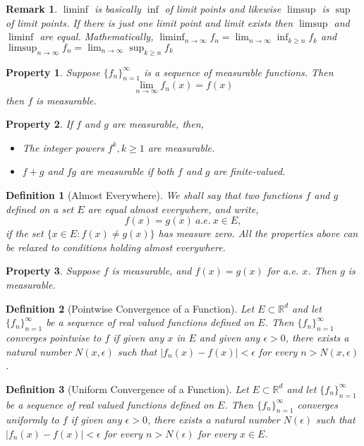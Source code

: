 \documentclass{report}
\theoremstyle{upthm}
\newtheorem{defn}{Definition}
\newtheorem{remark}{Remark}
\newtheorem{property}{Property}
\newcommand{\reals}{\mathbb{R}}
\newcommand{\set}[1]{\big\lbrace #1 \big\rbrace}
\begin{document}
\begin{remark}
	$\liminf$ is basically $\inf$ of limit points and likewise $\limsup$ is $\sup$ of limit points. If there is just one limit point and limit exists then $\limsup$ and $\liminf$ are equal. Mathematically, $\liminf_{n \rightarrow \infty} f_n= \lim_{n \rightarrow \infty} \inf_{k \geq n} f_k$ and  $\limsup_{n \rightarrow \infty} f_n= \lim_{n \rightarrow \infty} \sup_{k \geq n} f_k$
\end{remark}

\begin{property}
	Suppose $\set{f_n}_{n=1}^\infty$ is a sequence of measurable functions. Then $$\lim_{n \rightarrow \infty} f_n(x) = f(x) $$ then $f$ is measurable.
\end{property}
\begin{property}
	If $f$ and $g$ are measurable, then,
	\begin{itemize}
		\item The integer powers $f^k, k \geq 1$ are measurable.
		\item $f + g$ and $fg$ are measurable if both $f$ and $g$ are finite-valued.
	\end{itemize}
\end{property}

\begin{defn}[Almost Everywhere]
	We shall say that two functions $f$ and $g$ defined on a set $E$ are equal almost everywhere, and write,
	$$ f(x) = g(x)\ a.e.\ x \in E,$$
	if the set $\set{x \in E : f(x) \neq g(x)}$ has measure zero. All the properties above can be relaxed to conditions holding almost everywhere.
\end{defn}

\begin{property}
	Suppose $f$ is measurable, and $f(x) = g(x)$ for a.e. $x$. Then $g$ is measurable.
\end{property}

\begin{defn}[Pointwise Convergence of a Function]
	Let $E \subset \reals^d$ and let $\set{f_n}_{n=1}^{\infty}$ be a sequence of real valued functions defined on $E$. Then $\set{f_n}_{n=1}^\infty$ converges pointwise to $f$ if given any $x$ in $E$ and	given any $\epsilon > 0$, there exists a natural number $N(x, \epsilon)$ such that $|f_n(x) - f(x)| < \epsilon$ for every $n > N(x, \epsilon)$.
\end{defn}

\begin{defn}[Uniform Convergence of a Function]
	Let $E \subset \reals^d$ and let $\set{f_n}_{n=1}^{\infty}$ be a sequence of real valued functions defined on $E$. Then $\set{f_n}_{n=1}^\infty$ converges uniformly to $f$ if given any $\epsilon > 0$, there exists a natural number $N(\epsilon)$ such that $|f_n(x) - f(x)| < \epsilon$ for every $n > N(\epsilon)$ for every $x \in E$.
\end{defn}
\end{document}
